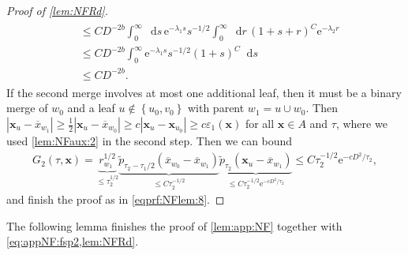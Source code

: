 \documentclass[reqno,draft]{amsart}
\numberwithin{equation}{section}
\theoremstyle{plain}
\theoremstyle{remark}
\newcommand{\N}{\mathbb{N}} %
\newcommand*\diff{\mathop{}\!\mathrm{d}}
\newcommand{\e}{\mathrm{e}}
\DeclareMathOperator{\lf}{lf}
\DeclareMathOperator{\dct}{tm}
\newcommand{\rfy}[1]{\widetilde{{#1}}} %
\newcommand{\ftm}{f_\mathrm{tm}^{\boldsymbol \lambda}}
\newcommand{\fsp}{f_\mathrm{sp}}
\newcommand{\interp}{\overline{x}} %
\begin{document}
\begin{proof}[Proof of \cref{lem:NFRd}]
\begin{align}
\begin{split}
                        &\le C D^{-2b} \int_0^\infty \diff s\, \e^{-\lambda_1 s}s^{-1 / 2} \int_0^\infty \diff r\, (1+s+r)^C \e^{-\lambda_2 r}\\
                        &\le C D^{-2b} \int_0^\infty \e^{-\lambda_1 s}s^{-1 / 2} (1+s)^C \diff s\\
                        &\le C D^{-2b}.
    \end{split}\end{align}
    If the second merge involves at most one additional leaf, then it must be a binary merge of $w_0$ and a leaf $u \not\in \left\{ u_0,v_0 \right\} $ with parent $w_1 = u \cup w_0$. Then $|\boldsymbol x_u - \interp_{w_1}| \ge \frac{1}{2} |\boldsymbol x_u - \interp_{w_0}| \ge c |\boldsymbol x_u - \boldsymbol x_{u_0}| \ge c \varepsilon_1(\boldsymbol x)$ for all $\boldsymbol x\in A$ and $\tau$, where we used \cref{lem:NFaux:2} in the second step. Then we can bound
    \begin{align*}
        G_2(\tau,\boldsymbol x) = \underbrace{r_{w_1}^{1 / 2}}_{\le \tau_2^{1 / 2}} \underbrace{\rfy{p}_{\tau_2 - \tau_1 / 2} (\interp_{w_0}-\interp_{w_1})}_{\le C \tau_2^{-1 / 2}}\underbrace{\rfy{p}_{\tau_2}(\boldsymbol x_u - \interp_{w_1})}_{\le C\tau_2^{-1 / 2}\e^{-cD^2 / \tau_2}}
                                \le C \tau_2^{-1 / 2} \e^{-c D^2 / \tau_2},
    \end{align*}
    and finish the proof as in \cref{eqprf:NFlem:8}.

\end{proof}

The following lemma finishes the proof of \cref{lem:app:NF} together with \cref{eq:appNF:fsp2,lem:NFRd}.
\end{document}
